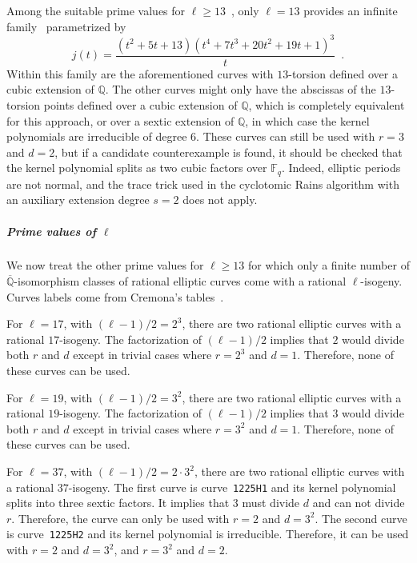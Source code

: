 \documentclass[12pt]{article}
\theoremstyle{plain}
\theoremstyle{definition}
\def\Q{\ensuremath{\mathbb{Q}}}
\def\F{\ensuremath{\mathbb{F}}}
\newcounter{algorithm}
\begin{document}
Among the suitable prime values for $\ell \geq 13$~\cite{Mazur1974},
only $\ell = 13$ provides an infinite family~\cite{Lozano-Robledo2013}
parametrized by
\[
j(t) = \frac{\left(t^2 + 5t + 13\right)\left(t^4 + 7t^3 + 20t^2 + 19t + 1\right)^3}{t} \enspace .
\]
Within this family are the aforementioned curves with $13$-torsion
defined over a cubic extension of $\Q$.
The other curves might only have the abscissas of the $13$-torsion points
defined over a cubic extension of $\Q$,
which is completely equivalent for this approach,
or over a sextic extension of $\Q$,
in which case the kernel polynomials are irreducible of degree $6$.
These curves can still be used with $r = 3$ and $d = 2$,
but if a candidate counterexample is found, it should be checked
that the kernel polynomial splits as two cubic factors over $\F_q$.
Indeed, elliptic periods are not normal, and the trace trick used
in the cyclotomic Rains algorithm with an auxiliary extension degree
$s = 2$ does not apply.

\subparagraph{Prime values of $\ell$}
We now treat the other prime values for $\ell \geq 13$
for which only a finite number of $\overline{\Q}$-isomorphism
classes of rational elliptic curves come with a rational $\ell$-isogeny.
Curves labels come from Cremona's tables~\cite{cremona_tables}.

For $\ell = 17$, with $(\ell-1)/2 = 2^3$,
there are two rational elliptic curves
with a rational $17$-isogeny.
The factorization of $(\ell-1)/2$ implies
that $2$ would divide both $r$ and $d$
except in trivial cases where $r = 2^3$ and $d = 1$.
Therefore, none of these curves can be used.

For $\ell = 19$,  with $(\ell-1)/2 = 3^2$,
there are two rational elliptic curves
with a rational $19$-isogeny.
The factorization of $(\ell-1)/2$ implies
that $3$ would divide both $r$ and $d$
except in trivial cases where $r = 3^2$ and $d = 1$.
Therefore, none of these curves can be used.

For $\ell = 37$, with $(\ell-1)/2 = 2\cdot3^2$,
there are two rational elliptic curves
with a rational $37$-isogeny.
The first curve is curve~\texttt{1225H1}
and its kernel polynomial splits into three sextic factors.
It implies that $3$ must divide $d$ and can not divide $r$.
Therefore, the curve can only be used with $r = 2$ and $d = 3^2$.
The second curve is curve~\texttt{1225H2}
and its kernel polynomial is irreducible.
Therefore, it can be used with $r = 2$ and $d = 3^2$,
and $r = 3^2$ and $d = 2$.
\end{document}
